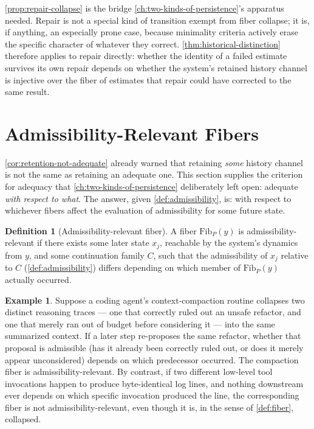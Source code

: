 \documentclass[11pt]{book}
\theoremstyle{plain}
\theoremstyle{definition}
\newtheorem{definition}[theorem]{Definition}
\newtheorem{example}[theorem]{Example}
\theoremstyle{remark}
\begin{document}
\cref{prop:repair-collapse} is the bridge \cref{ch:two-kinds-of-persistence}'s
apparatus needed. Repair is not a special kind of transition exempt
from fiber collapse; it is, if anything, an especially prone case,
because minimality criteria actively erase the specific character of
whatever they correct. \cref{thm:historical-distinction} therefore
applies to repair directly: whether the identity of a failed
estimate survives its own repair depends on whether the system's
retained history channel is injective over the fiber of estimates
that repair could have corrected to the same result.

\section{Admissibility-Relevant Fibers}

\cref{cor:retention-not-adequate} already warned that retaining
\emph{some} history channel is not the same as retaining an adequate
one. This section supplies the criterion for adequacy that
\cref{ch:two-kinds-of-persistence} deliberately left open: adequate
\emph{with respect to what}. The answer, given
\cref{def:admissibility}, is: with respect to whichever fibers affect
the evaluation of admissibility for some future state.

\begin{definition}[Admissibility-relevant fiber]
\label{def:admissibility-relevant}
A fiber $\mathrm{Fib}_P(y)$ is admissibility-relevant if there exists
some later state $x_j$, reachable by the system's dynamics from $y$,
and some continuation family $C$, such that the admissibility of $x_j$
relative to $C$ (\cref{def:admissibility}) differs depending on which
member of $\mathrm{Fib}_P(y)$ actually occurred.
\end{definition}

\begin{example}
Suppose a coding agent's context-compaction routine collapses two
distinct reasoning traces --- one that correctly ruled out an unsafe
refactor, and one that merely ran out of budget before considering it
--- into the same summarized context. If a later step re-proposes the
same refactor, whether that proposal is admissible (has it already
been correctly ruled out, or does it merely appear unconsidered)
depends on which predecessor occurred. The compaction fiber is
admissibility-relevant. By contrast, if two different low-level tool
invocations happen to produce byte-identical log lines, and nothing
downstream ever depends on which specific invocation produced the
line, the corresponding fiber is not admissibility-relevant, even
though it is, in the sense of \cref{def:fiber}, collapsed.
\end{example}
\end{document}
